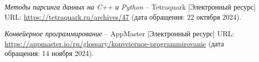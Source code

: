 
\renewcommand{\refname}{\begin{center}\MakeUppercase{Список использованных источников}\end{center}}

\makeatletter
\renewcommand\@biblabel[1]{#1.} %
\makeatother

\begin{thebibliography}{9}

\textit{Методы парсинга данных на C++ и Python} -- Tetraquark [Электронный ресурс] URL: \url{https://tetraquark.ru/archives/47} (дата обращения: 22 октября 2024).

\textit{Конвейерное программирование} -- AppMaster [Электронный ресурс] URL: \url{https://appmaster.io/ru/glossary/konveiernoe-programmirovanie} (дата обращения: 14 ноября 2024).
  
\end{thebibliography}